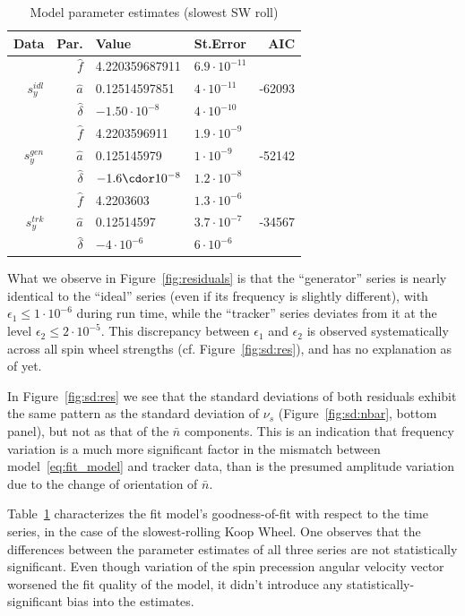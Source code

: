 \documentclass[a4paper]{jacow}
\newcommand{\nbar}{\bar n}
\begin{document}
\begin{table}[h]
  \caption{Model parameter estimates (slowest SW roll)\label{tbl:param_estimates}}
  \begin{tabular}{r|rllr}
    \toprule
    Data & Par. & Value & St.Error & AIC \\
    \midrule
    \multirow{3}{*}{$s_y^{idl}$}
    & $\hat f$ & 4.220359687911 & $6.9\cdot10^{-11}$ & \multirow{3}{*}{-62093} \\
    & $\hat a$ & 0.12514597851 & $4\cdot10^{-11}$ & \\
    & $\hat\delta$ & $-1.50\cdot10^{-8}$ & $4\cdot 10^{-10}$ &\\
    \hline
    \multirow{3}{*}{$s_y^{gen}$}
    & $\hat f$ & 4.2203596911 & $1.9\cdot 10^{-9}$ & \multirow{3}{*}{-52142} \\
    & $\hat a$ & 0.125145979 & $1\cdot 10^{-9}$ & \\
    & $\hat\delta$ & $-1.6\cdor10^{-8}$ & $1.2\cdot 10^{-8}$ &\\
    \hline
    \multirow{3}{*}{$s_y^{trk}$}
    & $\hat f$ & 4.2203603 & $1.3\cdot 10^{-6}$ & \multirow{3}{*}{-34567} \\
    & $\hat a$ & 0.12514597 & $3.7\cdot10^{-7}$ & \\
    & $\hat\delta$ & $-4\cdot10^{-6}$ & $6\cdot 10^{-6}$ &\\
    \bottomrule
  \end{tabular}
\end{table}

What we observe in Figure~\ref{fig:residuals} is that the ``generator'' series is nearly identical
to the ``ideal'' series (even if its frequency is slightly different), with $\epsilon_1 \le 1\cdot10^{-6}$
during run time,
while the ``tracker'' series deviates from it at the level
$\epsilon_2 \le 2\cdot 10^{-5}$. This discrepancy between $\epsilon_1$ and $\epsilon_2$ is observed
systematically across all spin wheel strengths (cf. Figure~\ref{fig:sd:res}), and has no explanation as of yet.

In Figure~\ref{fig:sd:res} we see that the standard deviations of both residuals exhibit the same pattern as
the standard deviation of $\nu_s$ (Figure~\ref{fig:sd:nbar}, bottom panel), but not as that of
the $\nbar$ components. This is an indication that frequency variation is a much more significant factor
in the mismatch between model~\eqref{eq:fit_model} and tracker data, than is the presumed amplitude variation
due to the change of orientation of $\nbar$.

Table~\ref{tbl:param_estimates} characterizes the fit model's goodness-of-fit with respect to the time series,
in the case of the slowest-rolling Koop Wheel.
One observes that the differences between the parameter estimates of all three series are not
statistically significant. Even though variation of the spin precession angular velocity vector worsened
the fit quality of the model, it didn't introduce any statistically-significant bias
into the estimates.
\end{document}
